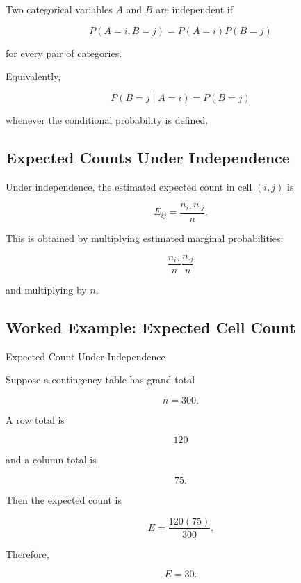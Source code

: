 Two categorical variables \(A\) and \(B\) are independent if

\[
\boxed{
P(A=i,B=j)
=
P(A=i)P(B=j)
}
\]

for every pair of categories.

Equivalently,

\[
\boxed{
P(B=j\mid A=i)
=
P(B=j)
}
\]

whenever the conditional probability is defined.

\subsection{Expected Counts Under Independence}
\label{subsec:expected-counts-categorical}

Under independence, the estimated expected count in cell \((i,j)\) is

\[
\boxed{
E_{ij}
=
\frac{
n_{i\cdot}n_{\cdot j}
}{
n
}.
}
\]

This is obtained by multiplying estimated marginal probabilities:

\[
\frac{n_{i\cdot}}{n}
\frac{n_{\cdot j}}{n}
\]

and multiplying by \(n\).

\subsection{Worked Example: Expected Cell Count}
\label{subsec:worked-expected-cell-count-categorical}

\begin{workedexamplebox}{Expected Count Under Independence}

Suppose a contingency table has grand total

\[
n=300.
\]

A row total is

\[
120
\]

and a column total is

\[
75.
\]

Then the expected count is

\[
E
=
\frac{
120(75)
}{
300
}.
\]

Therefore,

\begin{answerbox}
\[
\boxed{
E=30.
}
\]
\end{answerbox}

\end{workedexamplebox}

